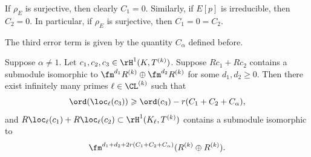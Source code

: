 \begin{remark}
\notready\label{rmkirred}
If $\rho_E$ is surjective, then clearly $C_1 = 0$. Similarly, if $E[p]$ is irreducible, then $C_2=0$. In particular, if $\rho_E$ is surjective, then $C_1 = 0 = C_2$.
\end{remark}

The third error term is given by the quantity $C_\alpha$ defined before.


\begin{prop}
\notready\label{prop:prime2} Suppose $\alpha\neq 1$.
Let $c_1, c_2, c_3 \in \rH^1(K,T^{(k)})$. Suppose $Rc_1 + Rc_2$ contains a submodule isomorphic to
$\fm^{d_1}R^{(k)}\oplus \fm^{d_2}R^{(k)}$ for some $d_1,d_2\geqslant 0$.
Then there exist infinitely many primes $\ell\in \CL^{(k)}$ such that
$$
\ord(\loc_\ell(c_3)) \geqslant \ord(c_3) - r(C_1+C_2+C_\alpha),
$$
and
$R\loc_\ell(c_1) + R \loc_\ell(c_2) \subset \rH^1(K_\ell,T^{(k)})$ contains a
submodule isomorphic to
$$
\fm^{d_1+d_2+2r(C_1+C_2+C_\alpha)}(R^{(k)}\oplus R^{(k)}).
$$
\end{prop}

